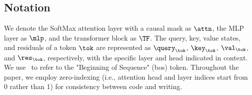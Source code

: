 






\subsection{Notation}
We denote the SoftMax attention layer with a causal mask as $\attn$, the MLP layer as $\mlp$, and the transformer block as $\TF$. The query, key, value states, and residuals of a token $\tok$ are represented as $\query_\tok$, $\key_\tok$, $\val_\tok$, and $\res_\tok$, respectively, with the specific layer and head indicated in context. We use \bos~to refer to the "Beginning of Sequence" (bos) token. Throughout the paper, we employ zero-indexing (i.e., attention head and layer indices start from 0 rather than 1) for consistency between code and writing. 
